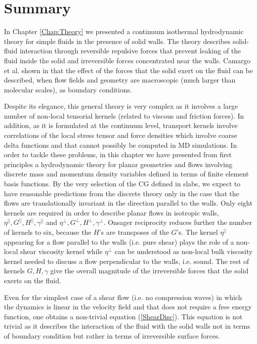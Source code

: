 \documentclass[b5paper,openright,11pt]{book}
\begin{document}
\section{Summary}
In Chapter \ref{Chap:Theory} we presented  a continuum isothermal
hydrodynamic  theory  for  simple  fluids in  the  presence  of  solid
walls. The theory describes solid-fluid interaction through reversible
repulsive forces  that prevent leaking  of the fluid inside  the solid
and irreversible forces concentrated near  the walls. Camargo et al. shown in
\cite{CamargoBC2018} that  the effect of  the forces that  the solid exert  on the
fluid can be described, when  flow fields and geometry are macroscopic
(much larger than molecular scales), as boundary conditions.

Despite  its elegance,  this  general  theory is  very  complex as  it
involves a  large number  of non-local  tensorial kernels  (related to
viscous and friction forces).  In addition, as it is formulated at the
continuum level,  transport kernels involve correlations  of the local
stress tensor and force densities  which involve coarse delta functions
and that cannot  possibly be computed in MD simulations.   In order to
tackle these problems,  in this chapter we  have presented from
first principles a hydrodynamic theory for planar geometries and flows
involving  discrete mass  and  momentum density  variables defined  in
terms of finite element basis functions.  By the very selection of the
CG defined in slabs, we expect to have reasonable predictions from the
discrete theory  only in the  case that the flows  are translationally
invariant in the direction parallel  to the walls.  Only eight kernels
are required  in order  to describe planar  flows in  isotropic walls,
$\eta^{||},G^{||},H^{||},\gamma^{||}$                              and
$\eta^{\bot},G^{\bot},H^{\bot},\gamma^{\bot}$.    Onsager  reciprocity
reduces further  the number of kernels  to six, because the  $H$'s are
transposes of the $G$'s.  The  kernel $\eta^{||}$ appearing for a flow
parallel to the walls (i.e. pure  shear) plays the role of a non-local
shear  viscosity  kernel  while  $\eta^{\bot}$ can  be  understood  as
non-local bulk viscosity kernel needed to discuss a flow perpendicular
to the walls,  i.e. sound.  The rest of kernels  $G,H,\gamma$ give the
overall magnitude of the irreversible  forces that the solid exerts on
the fluid.

Even for the simplest case of a shear flow (i.e. no compression waves)
in which  the dynamics is linear  in the velocity field  and that does
not require a free energy function, one obtains a non-trivial equation
(\ref{ShearDisc}). This  equation is not  trivial as it  describes the
interaction of the fluid with the solid walls not in terms of boundary
condition but rather in terms of irreversible surface forces.
\end{document}
